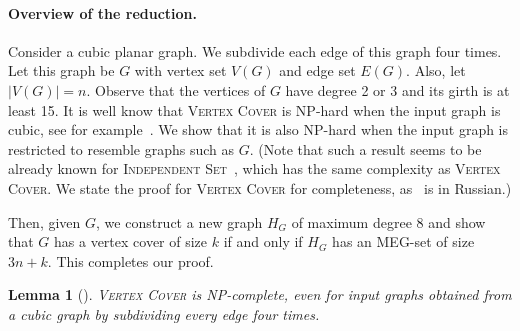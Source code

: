 \documentclass[10pt,a4paper]{article}
\newtheorem{lemma}[theorem]{Lemma}
\begin{document}
\paragraph{Overview of the reduction.} Consider a cubic planar graph. We subdivide each edge of this graph four times. Let this graph be $G$ with vertex set $V(G)$ and edge set $E(G)$. Also, let $|V(G)| = n$. Observe that the vertices of $G$ have degree 2 or 3 and its girth is at least 15. It is well know that \textsc{Vertex Cover} is NP-hard when the input graph is cubic, see for example~\cite{mohar2001face}. We show that it is also NP-hard when the input graph is restricted to resemble graphs such as $G$. (Note that such a result seems to be already known for \textsc{Independent Set}~\cite{alekseev1982effect}, which has the same complexity as \textsc{Vertex Cover}. We state the proof for \textsc{Vertex Cover} for completeness, as~\cite{alekseev1982effect} is in Russian.)

Then, given $G$, we construct a new graph $H_G$ of maximum degree 8 and show that $G$ has a vertex cover of size $k$ if and only if $H_G$ has an MEG-set of size $3n +k$. This completes our proof.



\begin{lemma}[\cite{alekseev1982effect}] \label{lem:vertex_cover}
\textsc{Vertex Cover} is NP-complete, even for input graphs obtained from a cubic graph by subdividing every edge four times.
\end{lemma}
\end{document}
